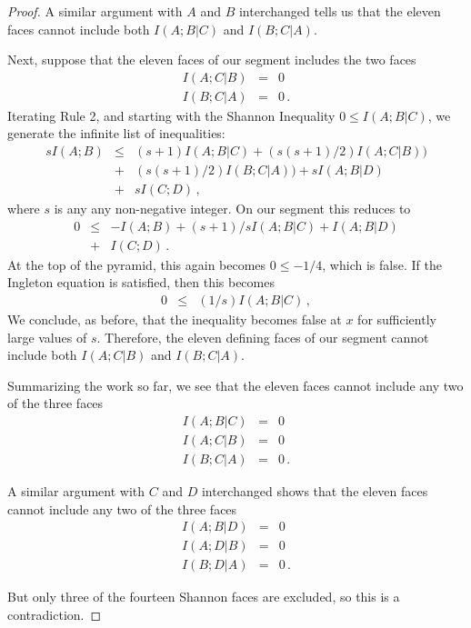 \documentclass[10pt,journal]{IEEEtran}
\begin{document}
\begin{proof}
A similar argument with $A$ and $B$ interchanged tells us that
the eleven faces cannot include both $I(A;B|C)$ and $I(B;C|A)$.

Next, suppose that the eleven faces of our segment includes the two faces
\begin{eqnarray*}
I(A;C|B)&=&0\\
I(B;C|A)&=&0\, .
\end{eqnarray*}
Iterating Rule 2, and starting with the Shannon Inequality
$0\leq I(A;B|C)$, we generate the infinite list of inequalities:
\begin{eqnarray*}
s I(A;B) &\leq& (s+1)I(A;B|C) +(s(s+1)/2)I(A;C|B))\\
&+&  (s(s+1)/2)I(B;C|A)) + s I(A;B|D)\\
 &+& s I(C;D)\, ,
\end{eqnarray*}
where $s$ is any any non-negative integer.
On our segment this reduces to
\begin{eqnarray*}
0  &\leq& -I(A;B) + (s+1)/s I(A;B|C)+I(A;B|D)\\
 &+& I(C;D)\, .
\end{eqnarray*}
At the top of the pyramid, this again becomes $0 \leq -1/4$, which is false.
If the Ingleton equation is satisfied, then this becomes
\begin{eqnarray*}
0  &\leq& (1/s) I(A;B|C)\, ,
\end{eqnarray*}
We conclude, as before, that the inequality becomes false at $x$ for sufficiently
large values of $s$.  Therefore, the eleven defining faces of our segment cannot include
both $I(A;C|B)$ and $I(B;C|A)$.

Summarizing the work so far, we see that the eleven faces cannot include any two of the three
faces
\begin{eqnarray*}
I(A;B|C)&=&0\\
I(A;C|B)&=&0\\
I(B;C|A)&=&0\, .
\end{eqnarray*}

A similar argument with $C$ and $D$ interchanged shows that the eleven faces cannot
include any two of the three faces
\begin{eqnarray*}
I(A;B|D)&=&0\\
I(A;D|B)&=&0\\
I(B;D|A)&=&0\, .
\end{eqnarray*}

But only three of the fourteen Shannon faces are excluded, so this is a contradiction.
\end{proof}
\end{document}
